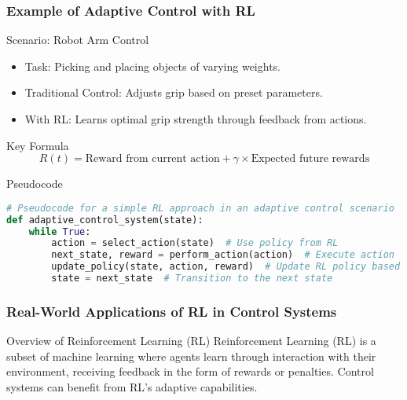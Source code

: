 \documentclass[aspectratio=169]{beamer}
\begin{document}
\begin{frame}[fragile]
    \frametitle{Example of Adaptive Control with RL}
    \begin{block}{Scenario: Robot Arm Control}
        \begin{itemize}
            \item Task: Picking and placing objects of varying weights.
            \item Traditional Control: Adjusts grip based on preset parameters.
            \item With RL: Learns optimal grip strength through feedback from actions.
        \end{itemize}
    \end{block}
    \begin{block}{Key Formula}
        \begin{equation}
            R(t) = \text{Reward from current action} + \gamma \times \text{Expected future rewards}
        \end{equation}
    \end{block}
    \begin{block}{Pseudocode}
        \begin{lstlisting}[language=Python]
# Pseudocode for a simple RL approach in an adaptive control scenario
def adaptive_control_system(state):
    while True:
        action = select_action(state)  # Use policy from RL
        next_state, reward = perform_action(action)  # Execute action
        update_policy(state, action, reward)  # Update RL policy based on reward
        state = next_state  # Transition to the next state
        \end{lstlisting}
    \end{block}
\end{frame}

\begin{frame}[fragile]
    \frametitle{Real-World Applications of RL in Control Systems}
    \begin{block}{Overview of Reinforcement Learning (RL)}
        Reinforcement Learning (RL) is a subset of machine learning where agents learn through interaction with their environment, receiving feedback in the form of rewards or penalties.
        Control systems can benefit from RL’s adaptive capabilities.
    \end{block}
\end{frame}
\end{document}
